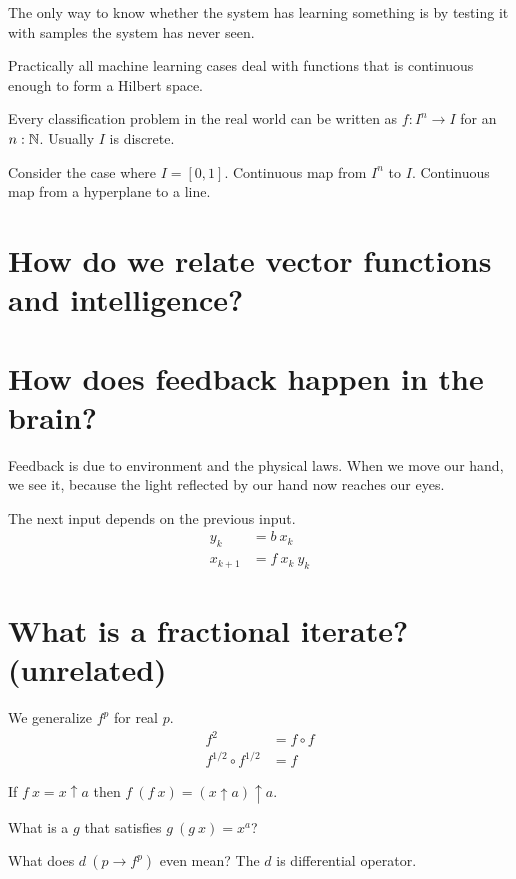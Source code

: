 The only way to know whether the system has learning something
is by testing it with samples the system has never seen.

Practically all machine learning cases deal with functions
that is continuous enough to form a Hilbert space.

Every classification problem in the real world can be written as \(f : I^n \to I\) for an \(n : \mathbb{N}\).
Usually \(I\) is discrete.

Consider the case where \(I = [0,1]\).
Continuous map from \(I^n\) to \(I\).
Continuous map from a hyperplane to a line.

\section{How do we relate vector functions and intelligence?}

\section{How does feedback happen in the brain?}

Feedback is due to environment and the physical laws.
When we move our hand, we see it, because the light
reflected by our hand now reaches our eyes.

The next input depends on the previous input.
\begin{align*}
    y_k &= b~x_k
    \\
    x_{k+1} &= f~x_k~y_k
\end{align*}

\section{What is a fractional iterate? (unrelated)}

We generalize \(f^p\) for real \(p\).
\begin{align*}
    f^2 &= f \circ f
    \\
    f^{1/2} \circ f^{1/2} &= f
\end{align*}

If \(f~x = x \uparrow a\) then \(f~(f~x) = (x \uparrow a) \uparrow a\).

What is a \(g\) that satisfies \(g~(g~x) = x^a\)?

What does \(d~(p \to f^p)\) even mean?
The \(d\) is differential operator.


